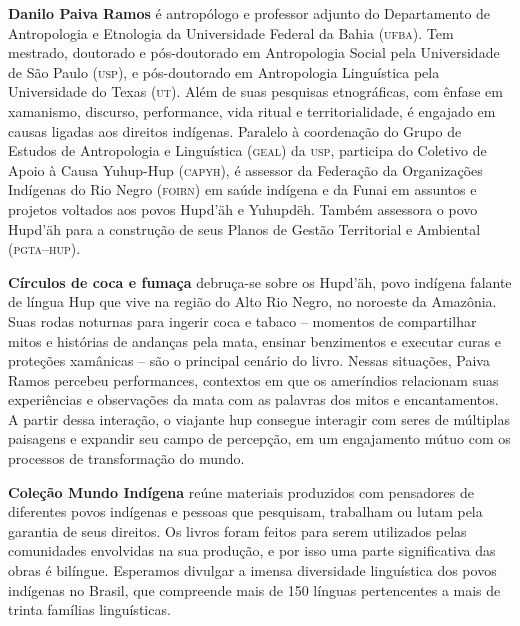 \textbf{Danilo Paiva Ramos} é antropólogo e professor adjunto do Departamento de Antropologia e Etnologia da Universidade Federal da Bahia \textsc{(ufba)}. Tem mestrado, doutorado e pós-doutorado em Antropologia Social pela Universidade de São Paulo \textsc{(usp)}, e pós-doutorado em Antropologia Linguística pela Universidade do Texas \textsc{(ut)}. Além de suas pesquisas etnográficas, com ênfase em xamanismo, discurso, performance, vida ritual e territorialidade, é engajado em causas ligadas aos direitos indígenas. Paralelo à coordenação do Grupo de Estudos de Antropologia e Linguística (\textsc{geal}) da \textsc{usp}, participa do Coletivo de Apoio à Causa Yuhup-Hup (\textsc{capyh}), é assessor da Federação da Organizações Indígenas do Rio Negro (\textsc{foirn}) em saúde indígena e da Funai em assuntos e projetos voltados aos povos Hupd'äh e Yuhupdëh. Também assessora o povo Hupd'äh para a construção de seus Planos de Gestão Territorial e Ambiental (\textsc{pgta--hup}).

\textbf{Círculos de coca e fumaça} debruça-se sobre os Hupd’äh, povo indígena falante de língua Hup que vive na região do Alto Rio Negro, no noroeste da Amazônia. Suas rodas noturnas para ingerir coca e tabaco -- momentos de compartilhar mitos e histórias de andanças pela mata, ensinar benzimentos e executar curas e proteções xamânicas -- são o principal cenário do livro. Nessas situações, Paiva Ramos percebeu performances, contextos em que os ameríndios relacionam suas experiências e observações da mata com as palavras dos mitos e encantamentos. A partir dessa interação, o viajante hup consegue interagir com seres de múltiplas paisagens e expandir seu campo de percepção, em um engajamento mútuo com os processos de transformação do mundo.

\textbf{Coleção Mundo Indígena} reúne materiais produzidos com pensadores de diferentes povos indígenas e pessoas que pesquisam, trabalham ou lutam pela garantia de seus direitos. Os livros foram feitos para serem utilizados pelas comunidades envolvidas na sua produção, e por isso uma parte significativa das obras é bilíngue. Esperamos divulgar a imensa diversidade linguística dos povos indígenas no Brasil, que compreende mais de 150 línguas pertencentes a mais de trinta famílias linguísticas.

